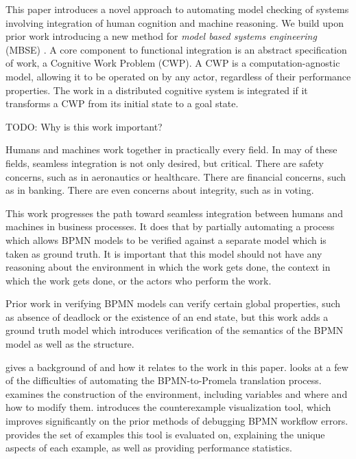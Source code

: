 This paper introduces a novel approach to automating model checking of systems involving integration of human cognition and machine reasoning. We build upon prior work introducing a new method for \emph{model based systems engineering} (MBSE) \cite{mercer22}. A core component to functional integration is an abstract specification of work, a Cognitive Work Problem (CWP). A CWP is a computation-agnostic model, allowing it to be operated on by any actor, regardless of their performance properties. The work in a distributed cognitive system is integrated if it transforms a CWP from its initial state to a goal state.

TODO: Why is this work important?

Humans and machines work together in practically every field. In may of these fields, seamless integration is not only desired, but critical. There are safety concerns, such as in aeronautics or healthcare. There are financial concerns, such as in banking. There are even concerns about integrity, such as in voting.

This work progresses the path toward seamless integration between humans and machines in business processes. It does that by partially automating a process which allows BPMN models to be verified against a separate model which is taken as ground truth. It is important that this model should not have any reasoning about the environment in which the work gets done, the context in which the work gets done, or the actors who perform the work.

Prior work in verifying BPMN models can verify certain global properties, such as absence of deadlock or the existence of an end state, but this work adds a ground truth model which introduces verification of the semantics of the BPMN model as well as the structure.


 gives a background of \cite{mercer22} and how it relates to the work in this paper.
 looks at a few of the difficulties of automating the BPMN-to-Promela translation process.
 examines the construction of the environment, including variables and where and how to modify them.
 introduces the counterexample visualization tool, which improves significantly on the prior methods of debugging BPMN workflow errors.
 provides the set of examples this tool is evaluated on, explaining the unique aspects of each example, as well as providing performance statistics.